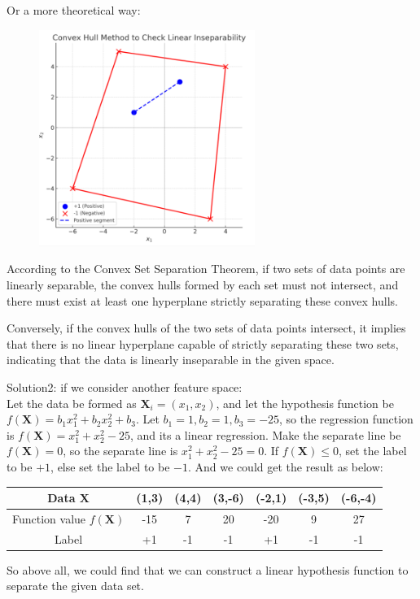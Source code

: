 Or a more theoretical way:
\begin{figure}[h]
    \centering
    \includegraphics[width=7cm]{figure/convex_hull.png}
\end{figure}

According to the Convex Set Separation Theorem, if two sets of data points are linearly separable, the convex hulls formed by each set must not intersect, and there must exist at least one hyperplane strictly separating these convex hulls.

Conversely, if the convex hulls of the two sets of data points intersect, it implies that there is no linear hyperplane capable of strictly separating these two sets, indicating that the data is linearly inseparable in the given space.


Solution2: if we consider another feature space: \\
Let the data be formed as $\mathbf{X}_i=(x_1,x_2)$, and let the hypothesis function be $f(\mathbf{X})=b_1x_1^2+b_2x_2^2+b_3$. Let $b_1=1,b_2=1,b_3=-25$, so the regression function is $f(\mathbf{X})=x_1^2+x_2^2-25$, and its a linear regression. Make the separate line be $f(\mathbf{X})=0$, so the separate line is $x_1^2+x_2^2-25=0$. If $f(\mathbf{X})\leq 0$, set the label to be $+1$, else set the label to be $-1$. And we could get the result as below:

\begin{table}[H]
\centering
\begin{tabular}{c|cccccc}
Data $\mathbf{X}$ & (1,3) & (4,4) & (3,-6) & (-2,1) & (-3,5) & (-6,-4) \\ \hline
Function value $f(\mathbf{X})$ & -15 & 7 & 20 & -20 & 9 & 27\\
Label & +1 & -1 & -1 & +1 & -1 & -1
\end{tabular}
\label{tab:my_label}
\end{table}

So above all, we could find that we can construct a linear hypothesis function to separate the given data set.

\newpage